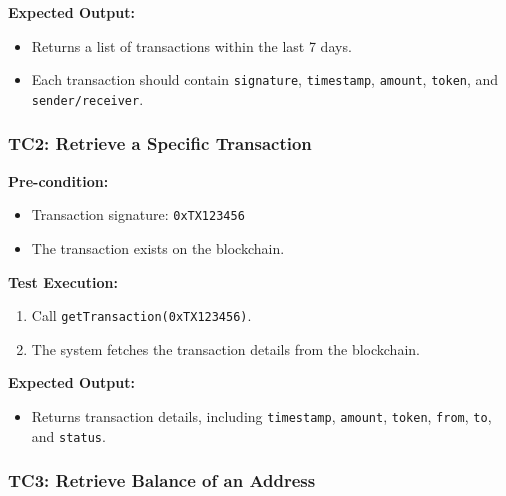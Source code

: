 \documentclass[
]{article}
\providecommand{\tightlist}{%
  \setlength{\itemsep}{0pt}\setlength{\parskip}{0pt}}
\begin{document}
\textbf{Expected Output:}

\begin{itemize}
\tightlist
\item
  Returns a list of transactions within the last 7 days.
\item
  Each transaction should contain \texttt{signature},
  \texttt{timestamp}, \texttt{amount}, \texttt{token}, and
  \texttt{sender/receiver}.
\end{itemize}

\hypertarget{tc2-retrieve-a-specific-transaction}{%
\subsubsection{\texorpdfstring{\textbf{TC2: Retrieve a Specific
Transaction}}{TC2: Retrieve a Specific Transaction}}\label{tc2-retrieve-a-specific-transaction}}

\textbf{Pre-condition:}

\begin{itemize}
\tightlist
\item
  Transaction signature: \texttt{0xTX123456}
\item
  The transaction exists on the blockchain.
\end{itemize}

\textbf{Test Execution:}

\begin{enumerate}
\def\labelenumi{\arabic{enumi}.}
\tightlist
\item
  Call \texttt{getTransaction(0xTX123456)}.
\item
  The system fetches the transaction details from the blockchain.
\end{enumerate}

\textbf{Expected Output:}

\begin{itemize}
\tightlist
\item
  Returns transaction details, including \texttt{timestamp},
  \texttt{amount}, \texttt{token}, \texttt{from}, \texttt{to}, and
  \texttt{status}.
\end{itemize}

\hypertarget{tc3-retrieve-balance-of-an-address}{%
\subsubsection{\texorpdfstring{\textbf{TC3: Retrieve Balance of an
Address}}{TC3: Retrieve Balance of an Address}}\label{tc3-retrieve-balance-of-an-address}}
\end{document}
